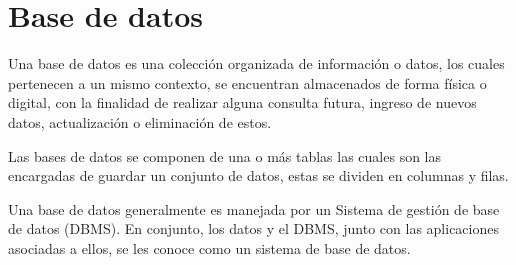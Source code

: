 \documentclass[12pt, a4paper, titlepage]{report}
\begin{document}
        \section{Base de datos}
        Una base de datos es una colección organizada de información o datos, los cuales pertenecen a un mismo contexto, se encuentran almacenados de forma física o digital, con la finalidad de realizar alguna consulta futura, ingreso de nuevos datos, actualización o eliminación de estos.\par
		Las bases de datos se componen de una o más tablas las cuales son las encargadas de guardar un conjunto de datos, estas se dividen en columnas y filas.\par
		Una base de datos generalmente es manejada por un \Gls{Sistema} de gestión de base de datos (DBMS). En conjunto, los datos y el DBMS, junto con las aplicaciones asociadas a ellos, se les conoce como un sistema de base de datos.\cite{refQueEsBD}\par
\end{document}
